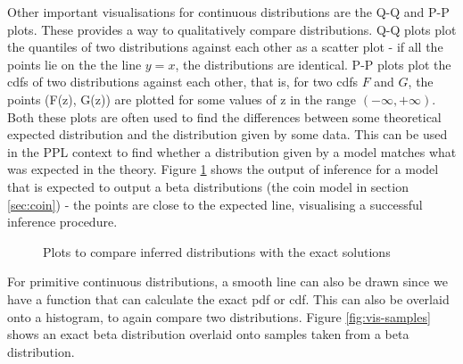 Other important visualisations for continuous distributions are the Q-Q and P-P plots. These provides a way to qualitatively compare distributions. Q-Q plots plot the quantiles of two distributions against each other as a scatter plot - if all the points lie on the the line $y=x$, the distributions are identical. P-P plots plot the cdfs of two distributions against each other, that is, for two cdfs $F$ and $G$, the points (F(z), G(z)) are plotted for some values of z in the range $(-\infty,+\infty)$. Both these plots are often used to find the differences between some theoretical expected distribution and the distribution given by some data. This can be used in the PPL context to find whether a distribution given by a model matches what was expected in the theory. Figure \ref{fig:vis-qq} shows the output of inference for a model that is expected to output a beta distributions (the coin model in section \ref{sec:coin}) - the points are close to the expected line, visualising a successful inference procedure.

\begin{figure}[!htb]
	\centering			
	\qquad
	\caption{Plots to compare inferred distributions with the exact solutions}
	\label{fig:vis-qq}
\end{figure}

For primitive continuous distributions, a smooth line can also be drawn since we have a function that can calculate the exact pdf or cdf. This can also be overlaid onto a histogram, to again compare two distributions. Figure \ref{fig:vis-samples} shows an exact beta distribution overlaid onto samples taken from a beta distribution.


